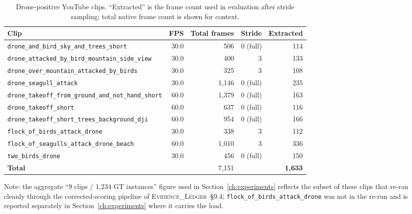 \begin{table}[htbp]
    \centering
    \caption{Drone-positive YouTube clips. ``Extracted'' is the frame count used in evaluation after stride sampling; total native frame count is shown for context.}
    \label{tab:youtube_drone_clips}
    \begin{tabular}{lrrrr}
        \toprule
        Clip & FPS & Total frames & Stride & Extracted \\
        \midrule
        \texttt{drone\_and\_bird\_sky\_and\_trees\_short}     & 30.0 &   506 & 0 (full) & 114 \\
        \texttt{drone\_attacked\_by\_bird\_mountain\_side\_view} & 30.0 & 400 & 3 & 133 \\
        \texttt{drone\_over\_mountain\_attacked\_by\_birds}   & 30.0 &   325 & 3 & 108 \\
        \texttt{drone\_seagull\_attack}                        & 30.0 & 1{,}146 & 0 (full) & 235 \\
        \texttt{drone\_takeoff\_from\_ground\_and\_not\_hand\_short} & 60.0 & 1{,}379 & 0 (full) & 163 \\
        \texttt{drone\_takeoff\_short}                         & 60.0 & 637 & 0 (full) & 116 \\
        \texttt{drone\_takeoff\_short\_trees\_background\_dji} & 60.0 & 954 & 0 (full) & 166 \\
        \texttt{flock\_of\_birds\_attack\_drone}              & 30.0 & 338 & 3 & 112 \\
        \texttt{flock\_of\_seagulls\_attack\_drone\_beach}    & 60.0 & 1{,}010 & 3 & 336 \\
        \texttt{two\_birds\_drone}                              & 30.0 & 456 & 0 (full) & 150 \\
        \midrule
        \textbf{Total} & & 7{,}151 & & \textbf{1{,}633} \\
        \bottomrule
    \end{tabular}
\end{table}

\noindent Note: the aggregate ``9 clips / 1{,}234 GT instances'' figure used in Section~\ref{ch:experiments} reflects the subset of these clips that re-ran cleanly through the corrected-scoring pipeline of \textsc{Evidence\_Ledger}~\S9.4; \texttt{flock\_of\_birds\_attack\_drone} was not in the re-run and is reported separately in Section~\ref{ch:experiments} where it carries the load.

